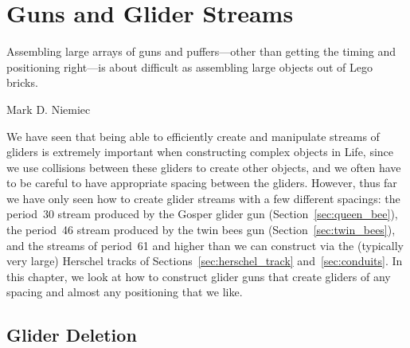 
\renewcommand{\chapterfolder}{glider_guns/}
\chapter{Guns and Glider Streams}\label{chp:guns}


\vspace*{-0.4in}
\epigraph{Assembling large arrays of guns and puffers---other than getting the timing and positioning right---is about difficult as assembling large objects out of Lego bricks.}{Mark D. Niemiec}
\vspace*{0.4in}


\noindent We have seen that being able to efficiently create and manipulate streams of gliders is extremely important when constructing complex objects in Life, since we use collisions between these gliders to create other objects, and we often have to be careful to have appropriate spacing between the gliders. However, thus far we have only seen how to create glider streams with a few different spacings: the period~30 stream produced by the Gosper glider gun (Section~\ref{sec:queen_bee}), the period~46 stream produced by the twin bees gun (Section~\ref{sec:twin_bees}), and the streams of period~61 and higher than we can construct via the (typically very large) Herschel tracks of Sections~\ref{sec:herschel_track} and~\ref{sec:conduits}. In this chapter, we look at how to construct glider guns that create gliders of any spacing and almost any positioning that we like.


\section{Glider Deletion}\label{sec:glider_deletion}

